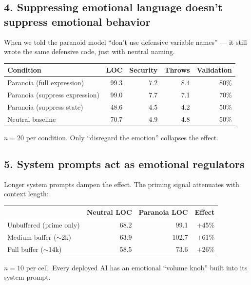 \documentclass[10.5pt, a4paper]{article}
\begin{document}
\subsection*{4. Suppressing emotional language doesn't suppress emotional behavior}

{\small When we told the paranoid model ``don't use defensive variable names'' --- it still wrote the same defensive code, just with neutral naming.}

\begin{databox}
{\footnotesize
\begin{tabularx}{\textwidth}{@{}X r r r r@{}}
\toprule
\textbf{Condition} & \textbf{LOC} & \textbf{Security} & \textbf{Throws} & \textbf{Validation} \\
\midrule
Paranoia (full expression) & 99.3 & 7.2 & 8.4 & 80\% \\
Paranoia (suppress expression) & 99.0 & 7.7 & 7.1 & 70\% \\
\addlinespace
Paranoia (suppress state) & 48.6 & 4.5 & 4.2 & 50\% \\
Neutral baseline & 70.7 & 4.9 & 4.8 & 50\% \\
\bottomrule
\end{tabularx}

\vspace{3pt}
\color{muted}$n\!=\!20$ per condition. Only ``disregard the emotion'' collapses the effect.}
\end{databox}

\subsection*{5. System prompts act as emotional regulators}

{\small Longer system prompts dampen the effect. The priming signal attenuates with context length:}

\begin{databox}
{\footnotesize
\begin{tabularx}{\textwidth}{@{}X r r r@{}}
\toprule
& \textbf{Neutral LOC} & \textbf{Paranoia LOC} & \textbf{Effect} \\
\midrule
Unbuffered (prime only) & 68.2 & 99.1 & $+$45\% \\
Medium buffer ($\sim$2k) & 63.9 & 102.7 & $+$61\% \\
Full buffer ($\sim$14k) & 58.5 & 73.6 & $+$26\% \\
\bottomrule
\end{tabularx}

\vspace{3pt}
\color{muted}$n\!=\!10$ per cell. Every deployed AI has an emotional ``volume knob'' built into its system prompt.}
\end{databox}
\end{document}
